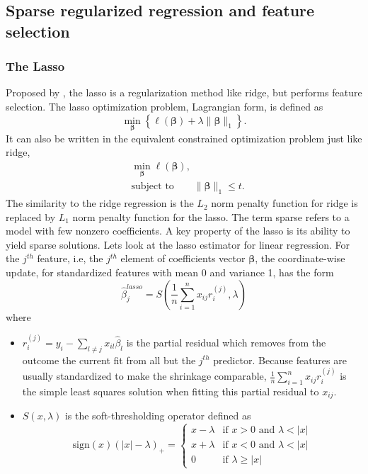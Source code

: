 \subsection{Sparse regularized regression and feature selection} \label{sec:sparse}
\subsubsection{The Lasso}
Proposed by \citep{tibshirani1996regression}, the lasso is a regularization method like ridge, but performs feature selection. The lasso optimization problem, Lagrangian form, is defined as 
\begin{equation}
    \min_{\bm{\beta}} \left\{ \ell(\bm{\beta})+\lambda\|\bm{\beta}\|_1  \right\}. \label{eq1.6}
\end{equation}
It can also be written in the equivalent constrained optimization problem just like ridge,
\begin{equation}
    \begin{aligned}
    &\min_{\bm{\beta}} \ell(\bm{\beta}), \\
    &\text{subject to} \qquad \|\bm{\beta}\|_1 \leq t. \label{eq1.7}
    \end{aligned}
\end{equation}
The similarity to the ridge regression is the $L_2$ norm penalty function for ridge is replaced by $L_1$ norm penalty function for the lasso. The term sparse refers to a model with few nonzero coefficients. A key property of the lasso is its ability to yield sparse solutions. Lets look at the lasso estimator for linear regression. For the $j^{th}$ feature, i.e, the $j^{th}$ element of coefficients vector $\bm{\beta}$, the coordinate-wise update, for standardized features with mean 0 and variance 1, has the form
\begin{equation}
    \hat{\beta}_j^{lasso}=S(\frac{1}{n}\sum_{i=1}^{n}x_{ij}r_i^{(j)}, \lambda) \label{eq1.8}
\end{equation}
where 
\begin{itemize}
    \item $r_i^{(j)} = y_i-\sum_{l\neq j}x_{il}\hat{\beta}_l$ is the partial residual which removes from the outcome the current fit from all but the $j^{th}$ predictor. Because features are usually standardized to make the shrinkage comparable, $\frac{1}{n}\sum_{i=1}^{n}x_{ij}r_i^{(j)}$ is the simple least squares solution when fitting this partial residual to $x_{ij}$.
    \item $S(x, \lambda)$ is the soft-thresholding operator defined as 
    \begin{equation}
        \text{sign}(x)(|x|-\lambda)_+ = 
            \begin{cases}
                x-\lambda & \text{if $x>0$ and $\lambda<|x|$}\\
                x+\lambda & \text{if $x<0$ and $\lambda<|x|$}\\
                0 & \text{if $\lambda \geq |x|$}
            \end{cases} \label{eq1.9}      
    \end{equation}
\end{itemize}
